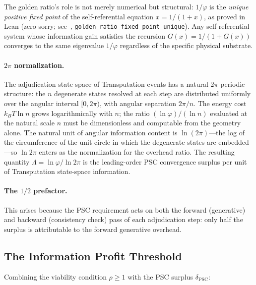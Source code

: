 \documentclass[11pt,twocolumn]{article}
\theoremstyle{remark}
\begin{document}
The golden ratio's role is not merely numerical but structural: $1/\varphi$ is the \emph{unique positive fixed point} of the self-referential equation $x = 1/(1+x)$, as proved in Lean (zero sorry; see~\cite{SpivackUGPPhysicsLean}, \texttt{golden\_ratio\_fixed\_point\_unique}). Any self-referential system whose information gain satisfies the recursion $G(x) = 1/(1+G(x))$ converges to the same eigenvalue $1/\varphi$ regardless of the specific physical substrate.

\paragraph{$2\pi$ normalization.}
The adjudication state space of Transputation events has a natural $2\pi$-periodic
structure: the $n$ degenerate states resolved at each step are distributed
uniformly over the angular interval $[0, 2\pi)$, with angular separation
$2\pi/n$. The energy cost $k_B T \ln n$ grows logarithmically with $n$;
the ratio $(\ln\varphi)/(\ln n)$ evaluated at the natural scale $n$
must be dimensionless and computable from the geometry alone. The
natural unit of angular information content is $\ln(2\pi)$---the log
of the circumference of the unit circle in which the degenerate states are
embedded---so $\ln 2\pi$ enters as the normalization for the overhead ratio.
The resulting quantity $\Lambda = \ln\varphi/\ln 2\pi$ is the leading-order
PSC convergence surplus per unit of Transputation state-space information.

\paragraph{The $1/2$ prefactor.}
This arises because the PSC requirement acts on both the forward
(generative) and backward (consistency check) pass of each adjudication
step: only half the surplus is attributable to the forward generative
overhead.

\subsection{The Information Profit Threshold}
\label{sec:deriv:ipt}

Combining the viability condition $\rho \geq 1$ with the PSC surplus
$\delta_{\mathrm{PSC}}$:
\end{document}
